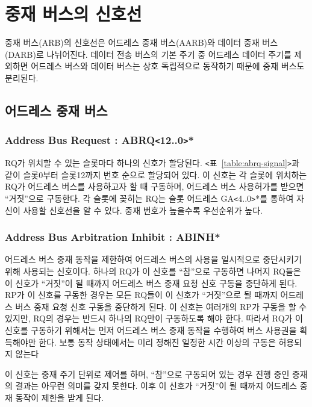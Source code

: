 \section{중재 버스의 신호선}
중재 버스(ARB)의 신호선은 어드레스 중재 버스(AARB)와 
데이터 중재 버스(DARB)로 나뉘어진다.  데이터 전송 버스의 기본 주기 중
어드레스 데이터 주기를 제외하면 어드레스 버스와 데이터 버스는 상호 독립적으로
동작하기 때문에 중재 버스도 분리된다. \\
%

%
\subsection{어드레스 중재 버스}
%
\subsubsection{Address Bus Request : ABRQ{\tt <}12..0{\tt >}*}
RQ가 위치할 수 있는 슬롯마다 하나의 신호가 할당된다.
{\tt <}표~\ref{table:abrq-signal}{\tt >}과 같이 슬롯0부터 슬롯12까지
번호 순으로 할당되어 있다. 이 신호는 각 슬롯에 위치하는 RQ가 어드레스 버스를
사용하고자 할 때 구동하며, 어드레스 버스 사용허가를 받으면 ``거짓''으로 구동한다.
각 슬롯에 꽂히는 RQ는 슬롯 어드레스 GA{\tt <}4..0{\tt >}*를 통하여 자신이 
사용할 신호선을 알 수 있다.
중재 번호가 높을수록 우선순위가 높다.

%
\subsubsection{Address Bus Arbitration Inhibit : ABINH*}
어드레스 버스 중재 동작을 제한하여
어드레스 버스의 사용을 일시적으로 중단시키기 위해 사용되는 신호이다.
하나의 RQ가 이 신호를 ``참''으로 구동하면 나머지 RQ들은
이 신호가 ``거짓''이 될 때까지
어드레스 버스 중재 요청 신호 구동을 중단하게 된다.
RP가 이 신호를 구동한 경우는 모든 RQ들이 이 신호가 ``거짓''으로 될 때까지
어드레스 버스 중재 요청 신호 구동을 중단하게 된다.
이 신호는 여러개의 RP가 구동을 할 수 있지만,
RQ의 경우는 반드시 하나의 RQ만이 구동하도록 해야 한다. 따라서
RQ가 이 신호를 구동하기 위해서는 먼저 어드레스 버스 중재 동작을 수행하여 
버스 사용권을 획득해야만 한다.
보통 동작 상태에서는 미리 정해진 일정한 시간 이상의 구동은 허용되지 않는다

이 신호는 중재 주기 단위로 제어를 하며, ``참''으로 구동되어 있는 경우 
진행 중인 중재의 결과는 아무런 의미를 갖지 못한다. 이후 이 신호가 ``거짓''이 될 
때까지 어드레스 중재 동작이 제한을 받게 된다.
%
